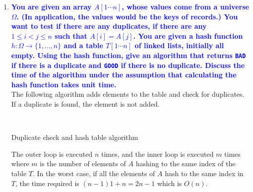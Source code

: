 \documentclass[11pt]{article}
\begin{document}
\begin{enumerate}
\item \textbf{\textcolor{blue}{You are given an array $A[1\cdots n]$, whose values come from a universe $\Omega$. (In application, the values would be the keys of records.) You want to test if there are any duplicates, if there are any $1\leq i < j \leq n$ such that $A[i]=A[j]$.  You are given a hash function $h:\Omega \rightarrow \{1,\ldots,n\}$ and a table $T[1\cdots n]$ of linked lists, initially all empty. Using the hash function,  give an algorithm that returns {\tt BAD} if there is a duplicate and {\tt GOOD} if there is no duplicate. Discuss the time of the algorithm under the assumption that calculating the hash function takes unit time.}}
    \\ The following algorithm adds elements to the table and check for duplicates. If a duplicate is found, the element is not added.
    \\
    \begin{algorithm}[H]
        \Indm{}\\
        \Indp
        \caption{Duplicate check and hash table algorithm}
    \end{algorithm}
    The outer loop is executed $n$ times, and the inner loop is executed $m$ times where
    $m$ is the number of elements of $A$ hashing to the same index of the table $T$. In the worst case, if all the elements of $A$ hash to the same index in $T$, the time required is $(n-1)1 + n = 2n - 1$ which is $O(n)$.


\end{enumerate}
\end{document}
